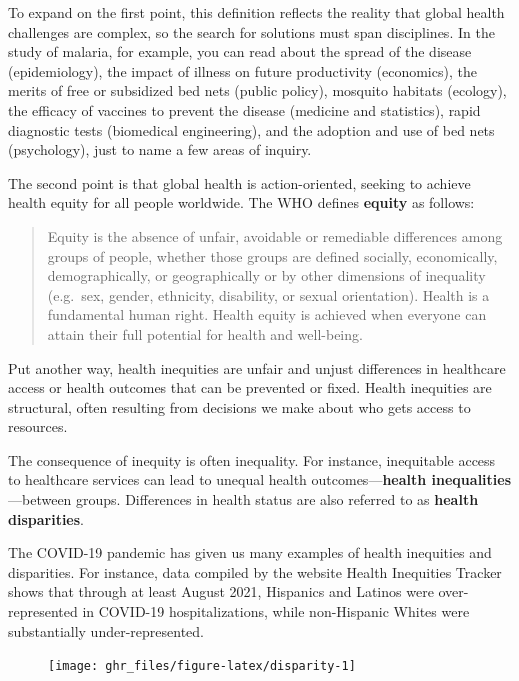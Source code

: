 \documentclass[justified,twoside,symmetric,]{tufte-book}
\renewcommand*{\citep}[1]{{\cite{#1}}}
\begin{document}
To expand on the first point, this definition reflects the reality that global health challenges are complex, so the search for solutions must span disciplines. In the study of malaria, for example, you can read about the spread of the disease (epidemiology), the impact of illness on future productivity (economics), the merits of free or subsidized bed nets (public policy), mosquito habitats (ecology), the efficacy of vaccines to prevent the disease (medicine and statistics), rapid diagnostic tests (biomedical engineering), and the adoption and use of bed nets (psychology), just to name a few areas of inquiry.

The second point is that global health is action-oriented, seeking to achieve health equity for all people worldwide. The WHO\citep{who:2021} defines \textbf{equity} as follows:

\begin{quote}
Equity is the absence of unfair, avoidable or remediable differences among groups of people, whether those groups are defined socially, economically, demographically, or geographically or by other dimensions of inequality (e.g.~sex, gender, ethnicity, disability, or sexual orientation). Health is a fundamental human right. Health equity is achieved when everyone can attain their full potential for health and well-being.
\end{quote}

Put another way, health inequities are unfair and unjust differences in healthcare access or health outcomes that can be prevented or fixed. Health inequities are structural, often resulting from decisions we make about who gets access to resources.

The consequence of inequity is often inequality. For instance, inequitable access to healthcare services can lead to unequal health outcomes---\textbf{health inequalities}---between groups. Differences in health status are also referred to as \textbf{health disparities}.

The COVID-19 pandemic has given us many examples of health inequities and disparities. For instance, data compiled by the website Health Inequities Tracker shows that through at least August 2021, Hispanics and Latinos were over-represented in COVID-19 hospitalizations, while non-Hispanic Whites were substantially under-represented.\citep{het}

\begin{figure}
\texttt{[image: ghr\_files/figure-latex/disparity-1]} \end{figure}
\end{document}
